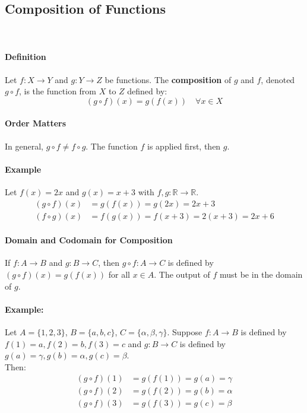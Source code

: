 \subsection*{Composition of Functions}
\hrulefill\\

\paragraph*{Definition}
Let $f: X \to Y$ and $g: Y \to Z$ be functions. The \textbf{composition} of $g$ and $f$, denoted $g \circ f$, is the function from $X$ to $Z$ defined by:
\begin{equation*}
    (g \circ f)(x) = g(f(x)) \quad \forall x \in X
\end{equation*}

\paragraph*{Order Matters}
In general, $g \circ f \neq f \circ g$. The function $f$ is applied first, then $g$.

\paragraph*{Example}
Let $f(x) = 2x$ and $g(x) = x + 3$ with $f, g: \mathbb{R} \to \mathbb{R}$.
\begin{align*}
    (g \circ f)(x) &= g(f(x)) = g(2x) = 2x + 3 \\
    (f \circ g)(x) &= f(g(x)) = f(x+3) = 2(x+3) = 2x + 6
\end{align*}

\paragraph*{Domain and Codomain for Composition}
If $f: A \to B$ and $g: B \to C$, then $g \circ f: A \to C$ is defined by $(g \circ f)(x) = g(f(x))$ for all $x \in A$. The output of $f$ must be in the domain of $g$.

\paragraph*{Example:}
Let $A = \{1,2,3\}$, $B = \{a,b,c\}$, $C = \{\alpha, \beta, \gamma\}$.
Suppose $f: A \to B$ is defined by $f(1)=a, f(2)=b, f(3)=c$ and $g: B \to C$ is defined by $g(a)=\gamma, g(b)=\alpha, g(c)=\beta$.
\\
Then:
\begin{align*}
    (g \circ f)(1) &= g(f(1)) = g(a) = \gamma \\
    (g \circ f)(2) &= g(f(2)) = g(b) = \alpha \\
    (g \circ f)(3) &= g(f(3)) = g(c) = \beta
\end{align*}

